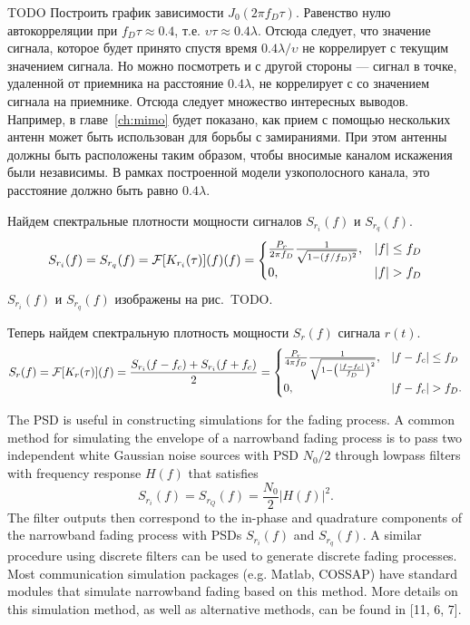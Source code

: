 \documentclass{book}
\numberwithin{theorem}{chapter}
\numberwithin{statement}{chapter}
\numberwithin{lemma}{chapter}
\theoremstyle{definition}
\numberwithin{task}{chapter}
\theoremstyle{remark}
\numberwithin{example}{chapter}
\theoremstyle{definition}
\numberwithin{definition}{chapter}
\theoremstyle{remark}
\theoremstyle{remark}
\numberwithin{lyrics}{section}
\begin{document}
TODO Построить график зависимости $J_0(2\pi f_D \tau)$. Равенство нулю автокорреляции при $f_D \tau \approx 0.4$, т.е. $\upsilon \tau \approx 0.4 \lambda$. Отсюда следует, что значение сигнала, которое будет принято спустя время $0.4 \lambda / \upsilon$ не коррелирует с текущим значением сигнала. Но можно посмотреть и с другой стороны --- сигнал в точке, удаленной от приемника на расстояние $0.4 \lambda$, не коррелирует с со значением сигнала на приемнике. Отсюда следует множество интересных выводов. Например, в главе~\ref{ch:mimo} будет показано, как прием с помощью нескольких антенн может быть использован для борьбы с замираниями. При этом антенны должны быть расположены таким образом, чтобы вносимые каналом искажения были независимы. В рамках построенной модели узкополосного канала, это расстояние должно быть равно $0.4\lambda$.

Найдем спектральные плотности мощности сигналов $S_{r_i}(f)$ и $S_{r_q}(f)$. 
\begin{gather}
S_{r_i}(f) = S_{r_q}(f) = \mathcal{F}[K_{r_i}(\tau)](f)(f) = 
\begin{cases}
\frac{P_r}{2 \pi f_D} \frac{1}{\sqrt{1 - (f / f_D)^2}}, & |f| \le f_D\\
0, & |f| > f_D
\end{cases}
\end{gather}
$S_{r_i}(f)$ и $S_{r_q}(f)$ изображены на рис.~TODO.

Теперь найдем спектральную плотность мощности $S_{r}(f)$ сигнала $r(t)$.
\begin{gather}
S_r(f) = \mathcal{F}[K_r(\tau)](f) = \frac{S_{r_i}(f - f_c) + S_{r_i}(f + f_c)}{2} = 
\begin{cases}
\frac{P_r}{4 \pi f_D} \frac{1}{\sqrt{1 - \left(\frac{|f - f_c|}{f_D}\right)^2}}, & |f - f_c| \le f_D \\
0, & |f - f_c| > f_D.
\end{cases}
\end{gather}

The PSD is useful in constructing simulations for the fading process. A common method for simulating the envelope of a narrowband fading process is to pass two independent white Gaussian noise sources with PSD $N_0 /2$ through lowpass filters with frequency response $H(f)$ that satisfies
$$
S_{r_i}(f) = S_{r_Q}(f) = \frac{N_0}{2} |H(f)|^2.
$$
The filter outputs then correspond to the in-phase and quadrature components of the narrowband fading process with PSDs $S_{r_i}(f)$ and $S_{r_q}(f)$. A similar procedure using discrete filters can be used to generate discrete fading processes. Most communication simulation packages (e.g. Matlab, COSSAP) have standard modules that simulate narrowband fading based on this method. More details on this simulation method, as well as alternative methods, can be found in [11, 6, 7].
\end{document}
